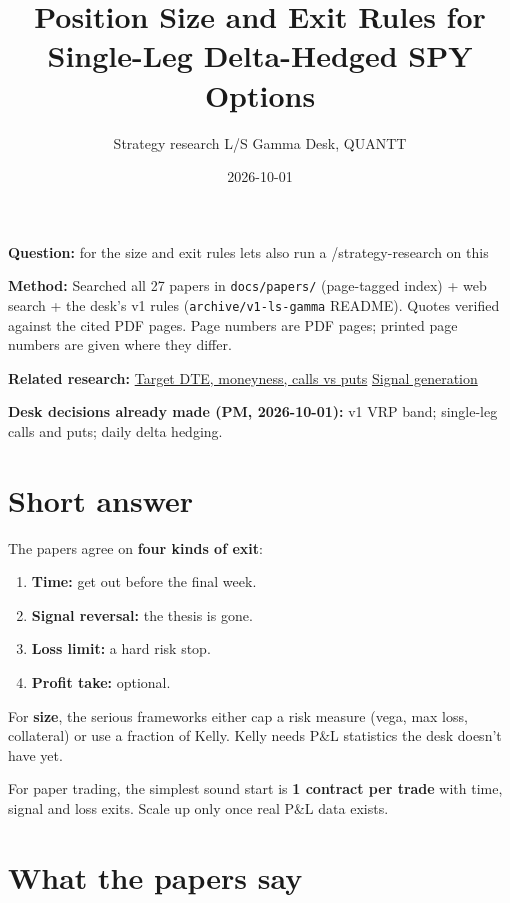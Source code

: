 \documentclass{article}
\title{Position Size and Exit Rules for Single-Leg Delta-Hedged SPY Options}
\author{Strategy research \textperiodcentered{} L/S Gamma Desk, QUANTT}
\date{2026-10-01}
\begin{document}
\maketitle

\textbf{Question:} for the size and exit rules lets also run a /\allowbreak{}strategy-research on this

\textbf{Method:} Searched all 27 papers in \texttt{docs/\allowbreak{}papers/\allowbreak{}} (page-tagged index) + web search + the desk's v1 rules (\texttt{archive/\allowbreak{}v1-\allowbreak{}ls-\allowbreak{}gamma} README). Quotes verified against the cited PDF pages. Page numbers are PDF pages; printed page numbers are given where they differ.

\textbf{Related research:} \href{2026-10-01-target-dte-moneyness-calls-vs-puts.pdf}{Target DTE, moneyness, calls vs puts} \textperiodcentered{} \href{2026-09-29-signal-generation-for-market-state.pdf}{Signal generation}

\textbf{Desk decisions already made (PM, 2026-10-01):} v1 VRP band; single-leg calls and puts; daily delta hedging.

\section{Short answer}

The papers agree on \textbf{four kinds of exit}:

\begin{enumerate}

\item \textbf{Time:} get out before the final week.

\item \textbf{Signal reversal:} the thesis is gone.

\item \textbf{Loss limit:} a hard risk stop.

\item \textbf{Profit take:} optional.

\end{enumerate}

For \textbf{size}, the serious frameworks either cap a risk measure (vega, max loss, collateral) or use a fraction of Kelly. Kelly needs P\&L statistics the desk doesn't have yet.

For paper trading, the simplest sound start is \textbf{1 contract per trade} with time, signal and loss exits. Scale up only once real P\&L data exists.

\section{What the papers say}
\end{document}
